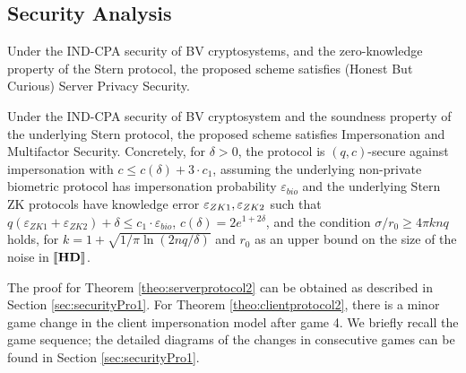 \subsection{Security Analysis}
\label{sec:protocol2SecurityProof}
\begin{theorem}
  \label{theo:serverprotocol2}
  Under the IND-CPA security of BV cryptosystems, and the zero-knowledge property of the Stern protocol, the proposed
  scheme satisfies (Honest But Curious) Server Privacy Security.
\end{theorem}
\begin{theorem}
  \label{theo:clientprotocol2}
  Under the IND-CPA security of BV cryptosystem and the soundness property of
  the underlying Stern protocol, the proposed scheme satisfies Impersonation and
  Multifactor Security. Concretely, for $\delta>0$, the protocol is
  $(q,c)$-secure against impersonation with $c \leq c(\delta) + 3 \cdot c_1$,
  assuming the underlying non-private biometric protocol has impersonation
  probability $\varepsilon_{bio}$ and the underlying Stern ZK protocols have
  knowledge error $\varepsilon_{ZK1},\varepsilon_{ZK2}$ such that
  $q(\varepsilon_{ZK1}+\varepsilon_{ZK2}) + \delta \leq c_1 \cdot
  \varepsilon_{bio}$, $c(\delta) = 2 e^{1+2\delta}$, and the condition
  $\sigma/r_0 \geq 4 \pi k n q$ holds, for
  $k = 1 + \sqrt{1/\pi \ln(2nq/\delta)}$ and $r_0$ as an upper bound on the size
  of the noise in $\left\llbracket\mathbf{HD}\right\rrbracket$.
\end{theorem}

The proof for Theorem \ref{theo:serverprotocol2} can be obtained as described in
Section \ref{sec:securityPro1}. For Theorem \ref{theo:clientprotocol2}, there is
a minor game change in the client impersonation model after game 4. We briefly
recall the game sequence; the detailed
diagrams of the changes in consecutive games can be found in Section
\ref{sec:securityPro1}.

